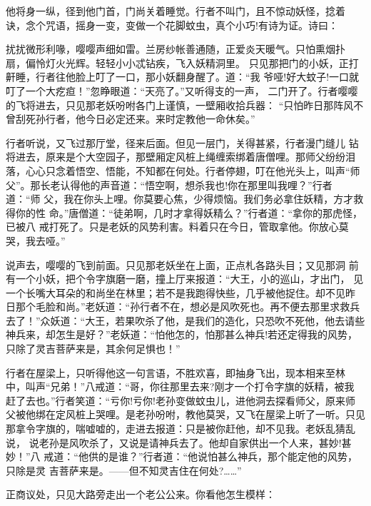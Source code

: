 他将身一纵，径到他门首，门尚关着睡觉。行者不叫门，且不惊动妖怪，捻着
诀，念个咒语，摇身一变，变做一个花脚蚊虫，真个小巧!有诗为证。诗曰：

扰扰微形利喙，嘤嘤声细如雷。兰房纱帐善通随，正爱炎天暖气。只怕熏烟扑
扇，偏怜灯火光辉。轻轻小小忒钻疾，飞入妖精洞里。
只见那把门的小妖，正打鼾睡，行者往他脸上叮了一口，那小妖翻身醒了。道：“我
爷哑!好大蚊子!一口就叮了一个大疙疸！”忽睁眼道：“天亮了。”又听得支的一声，
二门开了。行者嘤嘤的飞将进去，只见那老妖吩咐各门上谨慎，一壁厢收拾兵器：
“只怕昨日那阵风不曾刮死孙行者，他今日必定还来。来时定教他一命休矣。”

行者听说，又飞过那厅堂，径来后面。但见一层门，关得甚紧，行者漫门缝儿
钻将进去，原来是个大空园子，那壁厢定风桩上绳缠索绑着唐僧哩。那师父纷纷泪
落，心心只念着悟空、悟能，不知都在何处。行者停翅，叮在他光头上，叫声“师
父”。那长老认得他的声音道：“悟空啊，想杀我也!你在那里叫我哩？”行者道：“师
父，我在你头上哩。你莫要心焦，少得烦恼。我们务必拿住妖精，方才救得你的性
命。”唐僧道：“徒弟啊，几时才拿得妖精么？”行者道：“拿你的那虎怪，已被八
戒打死了。只是老妖的风势利害。料着只在今日，管取拿他。你放心莫哭，我去哑。”

说声去，嘤嘤的飞到前面。只见那老妖坐在上面，正点札各路头目；又见那洞
前有一个小妖，把个令字旗磨一磨，撞上厅来报道：“大王，小的巡山，才出门，
见一个长嘴大耳朵的和尚坐在林里；若不是我跑得快些，几乎被他捉住。却不见昨
日那个毛脸和尚。”老妖道：“孙行者不在，想必是风吹死也。再不便去那里求救兵
去了！”众妖道：“大王，若果吹杀了他，是我们的造化，只恐吹不死他，他去请些
神兵来，却怎生是好？”老妖道：“怕他怎的，怕那甚么神兵!若还定得我的风势，
只除了灵吉菩萨来是，其余何足惧也！”

行者在屋梁上，只听得他这一句言语，不胜欢喜，即抽身飞出，现本相来至林
中，叫声“兄弟！”八戒道：“哥，你往那里去来?刚才一个打令字旗的妖精，被我
赶了去也。”行者笑道：“亏你!亏你!老孙变做蚊虫儿，进他洞去探看师父，原来师
父被他绑在定风桩上哭哩。是老孙吩咐，教他莫哭，又飞在屋梁上听了一听。只见
那拿令字旗的，喘嘘嘘的，走进去报道：只是被你赶他，却不见我。老妖乱猜乱说，
说老孙是风吹杀了，又说是请神兵去了。他却自家供出一个人来，甚妙!甚妙！”八
戒道：“他供的是谁？”行者道：“他说怕甚么神兵，那个能定他的风势，只除是灵
吉菩萨来是。——但不知灵吉住在何处?……”

正商议处，只见大路旁走出一个老公公来。你看他怎生模样：

